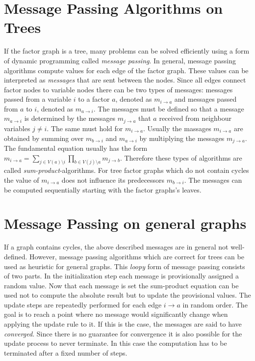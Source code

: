 \section{Message Passing Algorithms on Trees}

If the factor graph is a tree, many problems can be solved efficiently using a form of dynamic programming called \emph{message passing}. \newline 
In general, message passing algorithms compute values for each edge of the factor graph. These values can be interpreted as \emph{messages} that are sent between the nodes. Since all edges connect factor nodes to variable nodes there can be two types of messages: messages passed from a variable $i$ to a factor $a$, denoted as $m_{i \rightarrow a}$ and messages passed from $a$ to $i$, denoted as $m_{a \rightarrow i}$. \newline
The messages must be defined so that a message $m_{a \rightarrow i}$ is determined by the messages $m_{j \rightarrow a}$ that $a$ received from neighbour variables $j \neq i$. 
The same must hold for $m_{i \rightarrow a}$. \newline
Usually the massages $m_{i \rightarrow a}$ are obtained by summing over $m_{b \rightarrow i}$ and $m_{a \rightarrow i}$ by multiplying the messages $m_{j \rightarrow a}$. The fundamental equation usually has the form $m_{i \rightarrow a} = \sum_{j \in V(a) \setminus i} \prod_{b \in V(j) \setminus a} m_{j \rightarrow b}$. Therefore these types of algorithms are called \emph{sum-product}-algorithms. \newline
For tree factor graphs which do not contain cycles the value of $m_{i \rightarrow a}$ does not influence its predecessors $m_{b \rightarrow i}$. The messages can be computed sequentially starting with the factor graphs's leaves.


\section{Message Passing on general graphs}
If a graph contains cycles, the above described messages are in general not well-defined. However, message passing algorithms which are correct for trees can be used as heuristic for general graphs. \newline
This \emph{loopy} form of message passing consists of two parts. In the initialization  step each message is provisionally assigned a random value. Now that each message is set the sum-product equation can be used not to compute the absolute result but to update the provisional values. The update steps are repeatedly performed for each edge $i \rightarrow a$ in random order. The goal is to reach a point where no message would significantly change when applying the update rule to it. If this is the case, the messages are said to have \emph{converged}. Since there is no guarantee for convergence it is also possible for the update process to never terminate. In this case the computation has to be terminated after a fixed number of steps.

